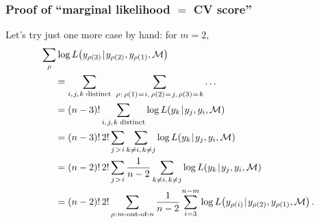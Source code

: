 \documentclass[18pt, handout]{beamer}
\newcommand{\defineTightSpacing}{%
	\setlength{\abovedisplayskip}{.25\baselineskip}%
	\setlength{\belowdisplayskip}{.25\baselineskip}%
}
\newcommand{\given}{\thinnerspace | \thinnerspace}
\newcommand{\spacedColon}{\mkern .5mu : \mkern 1mu}
\newcommand{\spacedEq}{\mkern 1mu = \mkern 1.5mu}
\newcommand{\thinnerspace}{\mskip.5\thinmuskip}
\newcommand{\likelihood}{L}
\newcommand{\modelSymbol}{\mathcal{M}}
\newcommand{\permutation}{\rho}
\newcommand{\trainingSize}{m}
\newcommand{\testSampleIndex}{i}
\begin{document}
\begin{frame}
\frametitle{Proof of ``marginal likelihood $=$ {\large CV} score''}
Let's try just one more case by hand: for $m = 2$,  
\begin{equation*} %
\begin{aligned}
&\sum_\permutation \log \likelihood\!\left(y_{\permutation(3)} \given y_{\permutation(2)}, y_{\permutation(1)}, \modelSymbol \right) \\
	&\hspace*{1.5em}= \sum_{\testSampleIndex, \thinnerspace j, \thinnerspace k \mkern 5mu \mathrm{distinct}} \ 
	\sum_{\permutation \thinnerspace : \, \permutation(1) \spacedEq i, \, \permutation(2) \spacedEq j, \, \permutation(3) \spacedEq k} \ldots \\
	&\hspace*{1.5em}= (n - 3)! \sum_{\testSampleIndex, \thinnerspace j, \thinnerspace k \mkern 5mu \mathrm{distinct}} \log \likelihood\!\left(y_k \given y_j, y_\testSampleIndex, \modelSymbol \right) \\
	&\hspace*{1.5em}= (n - 3)! \, 2! \sum_{j \thinnerspace > \thinnerspace \testSampleIndex} \sum_{k \neq \testSampleIndex, \thinnerspace k \neq j} \log \likelihood\!\left(y_k \given y_j, y_\testSampleIndex, \modelSymbol \right) \\
	&\hspace*{1.5em}= (n - 2)! \, 2! \sum_{j \thinnerspace > \thinnerspace \testSampleIndex} 
		\frac{1}{n - 2}\sum_{k \neq \testSampleIndex, \thinnerspace k \neq j} \log \likelihood\!\left(y_k \given y_j, y_\testSampleIndex, \modelSymbol \right) \\
	&\hspace*{1.5em}= (n - 2)! \, 2! \sum_{\permutation \spacedColon \text{$\trainingSize$-out-of-$n$}}
		\frac{1}{n - 2} \sum_{\testSampleIndex = 3}^{n - \trainingSize} \log \likelihood\!\left(y_{\permutation(\testSampleIndex)} \given y_{\permutation(2)}, y_{\permutation(1)}, \modelSymbol \right).
\end{aligned}
\end{equation*}
\end{frame}
\end{document}

